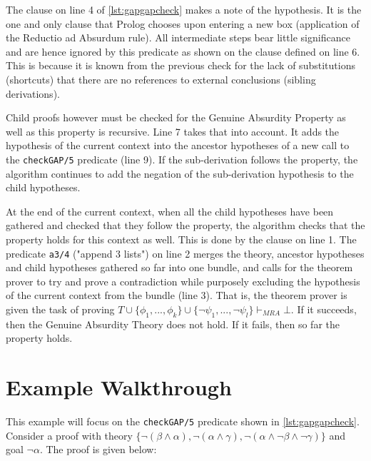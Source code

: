 \documentclass[11pt,twoside,a4paper]{report}
\begin{document}
The clause on line 4 of \autoref{lst:gapgapcheck} makes a note of the hypothesis. It is the one and only clause that Prolog chooses upon entering a new box (application of the Reductio ad Absurdum rule). All intermediate steps bear little significance and are hence ignored by this predicate as shown on the clause defined on line 6. This is because it is known from the previous check for the lack of substitutions (shortcuts) that there are no references to external conclusions (sibling derivations).

Child proofs however must be checked for the Genuine Absurdity Property as well as this property is recursive. Line 7 takes that into account. It adds the hypothesis of the current context into the ancestor hypotheses of a new call to the \lstinline$checkGAP/5$ predicate (line 9). If the sub-derivation follows the property, the algorithm continues to add the negation of the sub-derivation hypothesis to the child hypotheses. 

At the end of the current context, when all the child hypotheses have been gathered and checked that they follow the property, the algorithm checks that the property holds for this context as well. This is done by the clause on line 1. The predicate \lstinline$a3/4$ ("append 3 lists") on line 2 merges the theory, ancestor hypotheses and child hypotheses gathered so far into one bundle, and calls for the theorem prover to try and prove a contradiction while purposely excluding the hypothesis of the current context from the bundle (line 3). That is, the theorem prover is given the task of proving $T\cup\{\phi_1, ..., \phi_k\}\cup\{\neg\psi_1, ..., \neg\psi_l\}\vdash_{MRA}\bot$. If it succeeds, then the Genuine Absurdity Theory does not hold. If it fails, then so far the property holds.

\section{Example Walkthrough}
This example will focus on the \lstinline$checkGAP/5$ predicate shown in \autoref{lst:gapgapcheck}. Consider a proof with theory $\{\neg(\beta\wedge\alpha), \neg(\alpha\wedge\gamma), \neg(\alpha\wedge\neg\beta\wedge\neg\gamma)\}$ and goal $\neg\alpha$. The proof is given below: 
\end{document}
